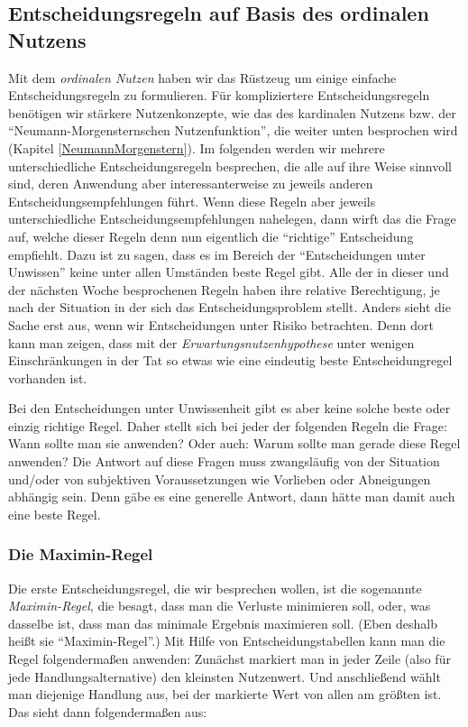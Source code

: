 \subsection{Entscheidungs\-regeln auf Basis des ordinalen\\Nutzens}

Mit dem {\em ordinalen Nutzen} haben wir das Rüstzeug um einige einfache
Entscheidungsregeln zu formulieren. Für kompliziertere Entscheidungsregeln
benötigen wir stärkere Nutzenkonzepte, wie das des kardinalen Nutzens bzw. der
"`Neumann-Morgensternschen Nutzenfunktion"', die weiter unten besprochen wird
(Kapitel \ref{NeumannMorgenstern}). Im folgenden werden wir mehrere
unterschiedliche Entscheidungsregeln besprechen, die alle auf ihre Weise sinnvoll
sind, deren Anwendung aber interessanterweise zu jeweils anderen
Entscheidungsempfehlungen führt. Wenn diese Regeln aber jeweils unterschiedliche
Entscheidungsempfehlungen nahelegen, dann wirft das die Frage auf, welche dieser
Regeln denn nun eigentlich die "`richtige"' Entscheidung empfiehlt. Dazu ist zu
sagen, dass es im Bereich der "`Entscheidungen unter Unwissen"' keine unter allen
Umständen beste Regel gibt. Alle der in dieser und der nächsten Woche
besprochenen Regeln haben ihre relative Berechtigung, je nach der Situation in
der sich das Entscheidungsproblem stellt. Anders sieht die Sache erst aus, wenn
wir Entscheidungen unter Risiko betrachten. Denn dort kann man zeigen, dass mit
der {\em Erwartungsnutzenhypothese} unter wenigen Einschränkungen in der Tat so
etwas wie eine eindeutig beste Entscheidungregel vorhanden ist.

Bei den Entscheidungen unter Unwissenheit gibt es aber keine solche beste oder
einzig richtige Regel. Daher stellt sich bei jeder der folgenden
Regeln die Frage: Wann sollte man sie anwenden? Oder auch:
Warum sollte man gerade diese Regel anwenden? Die Antwort auf diese Fragen muss
zwangsläufig von der Situation und/oder von subjektiven Voraussetzungen
wie Vorlieben oder Abneigungen abhängig sein. Denn gäbe es eine generelle
Antwort, dann hätte man damit auch eine beste Regel.

\subsubsection{Die Maximin-Regel}
\label{maximinRegel}
Die erste Entscheidungsregel, die wir besprechen wollen, ist die sogenannte {\em
Maximin-Regel}, die besagt, dass man die Verluste minimieren soll, oder, was
dasselbe ist, dass man das minimale Ergebnis maximieren soll. (Eben deshalb heißt
sie "`Maximin-Regel"'.) Mit Hilfe von Entscheidungstabellen kann man die Regel
folgendermaßen anwenden: 
Zunächst markiert man in jeder Zeile (also für jede
Handlungsalternative) den kleinsten Nutzenwert. Und anschließend wählt man
diejenige Handlung aus, bei der markierte Wert von allen am größten ist. Das
sieht dann folgendermaßen aus:

